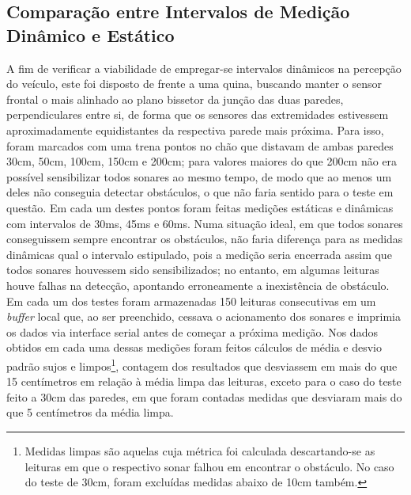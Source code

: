 \subsection{Comparação entre Intervalos de Medição Dinâmico e Estático}
A fim de verificar a viabilidade de empregar-se intervalos dinâmicos na percepção do veículo, este foi disposto de frente a uma quina, buscando 
manter o sensor frontal o mais alinhado ao plano bissetor da junção das duas paredes, perpendiculares entre si, de forma que os sensores das 
extremidades estivessem aproximadamente equidistantes da respectiva parede mais próxima. 
Para isso, foram marcados com uma trena pontos no chão que distavam de ambas paredes 30cm, 50cm, 100cm, 150cm e 200cm; para valores 
maiores do que 200cm não era possível sensibilizar todos sonares ao mesmo tempo, de modo que ao menos um deles não conseguia detectar obstáculos, o 
que não faria sentido para o teste em questão.
Em cada um destes pontos foram feitas medições estáticas e dinâmicas com intervalos de 30ms, 45ms e 60ms. Numa situação ideal, em que todos sonares 
conseguissem sempre encontrar os obstáculos, não faria diferença para as medidas dinâmicas qual o intervalo estipulado, pois a medição seria 
encerrada assim que todos sonares houvessem sido sensibilizados; no entanto, em algumas leituras houve falhas na detecção, apontando erroneamente a 
inexistência de obstáculo.
Em cada um dos testes foram armazenadas 150 leituras consecutivas em um \textit{buffer} local que, ao ser preenchido, cessava o acionamento dos 
sonares e imprimia os dados via interface serial antes de começar a próxima medição.
Nos dados obtidos em cada uma dessas medições foram feitos cálculos de média e desvio padrão sujos e limpos\footnote{Medidas limpas são aquelas cuja 
métrica foi calculada descartando-se as leituras em que o respectivo sonar falhou em encontrar o obstáculo. No caso do teste de 30cm, foram 
excluídas medidas abaixo de 10cm também.}, contagem dos resultados que desviassem em mais do que 15 centímetros em relação à média limpa das 
leituras, exceto para o caso do teste feito a 30cm das paredes, em que foram contadas medidas que desviaram mais do que 5 centímetros da média limpa.


